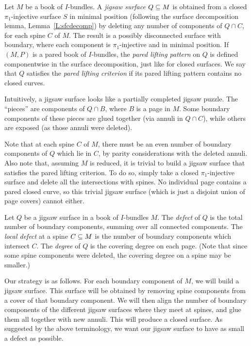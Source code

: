 \begin{defn}

Let $M$ be a book of $I$-bundles. A \emph{jigsaw surface} $Q \subseteq
M$ is obtained from a closed $\pi_1$-injective surface $S$ in minimal position
(following the surface decomposition lemma, Lemma~\ref{L:sfcdecomp}) by
deleting any number of components of $Q \cap C$, for each spine $C$ of $M$. The
result is a possibly disconnected surface with boundary, where each component
is $\pi_1$-injective and in minimal position. If $(M,P)$ is a pared book of
$I$-bundles, the \emph{pared lifting pattern} on $Q$ is defined componentwise
in the surface decomposition, just like for closed surfaces. We say that $Q$
satisfies the \emph{pared lifting criterion} if its pared lifting pattern
contains no closed curves.

\end{defn}

Intuitively, a jigsaw surface looks like a partially completed jigsaw puzzle.
The ``pieces'' are components of $Q \cap B$, where $B$ is a page in $M$.  Some
boundary components of these pieces are glued together (via annuli in $Q \cap
C$), while others are exposed (as those annuli were deleted).

Note that at each spine $C$ of $M$, there must be an even number of boundary
components of $Q$ which lie in $C$, by parity considerations with the deleted
annuli. Also note that, assuming $M$ is reduced, it is trivial to build
a jigsaw surface that satisfies the pared lifting criterion. To
do so, simply take a closed $\pi_1$-injective surface and delete all the
intersections with spines.  No individual page contains a pared closed curve,
so this trivial jigsaw surface (which is just a disjoint union of
page covers) cannot either.

\begin{defn}

Let $Q$ be a jigsaw surface in a book of $I$-bundles $M$. The
\emph{defect} of $Q$ is the total number of boundary components, summing over
all connected components. The \emph{local defect} at a spine $C \subseteq M$ is the
number of boundary components which intersect $C$. The \emph{degree} of $Q$ is
the covering degree on each page. (Note that since some spine components were
deleted, the covering degree on a spine may be smaller.)

\end{defn}

Our strategy is as follows. For each boundary component of $M$, we will build
a jigsaw surface. This surface will be obtained by removing spine
components from a cover of that boundary component. We will then align the
number of boundary components of the different jigsaw surfaces
where they meet at spines, and glue them all together with new annuli. This
will produce a closed surface. As suggested by the above terminology, we want
our jigsaw surface to have as small a defect as possible.

